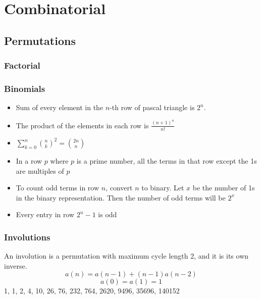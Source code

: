 \newcommand*{\Comb}[2]{{}^{#1}C_{#2}}%
\newcommand{\stirlingfirst}[2]{\genfrac{[}{]}{0pt}{}{#1}{#2}}
\newcommand{\stirlingsecond}[2]{\genfrac{\{}{\}}{0pt}{}{#1}{#2}}

\pagebreak

\chapter{Combinatorial}

\section{Permutations}
	\subsection{Factorial}
		 

\subsection{Binomials}
	\begin{itemize}
	\item Sum of every element in the $n$-th row of pascal triangle is $2^n$.
	\item The product of the elements in each row is $\frac{(n + 1)^n}{n!}$
	\item $\sum_{k = 0}^{n} \binom{n}{k}^2 = \binom{2n}{n}$
	\item In a row $p$ where $p$ is a prime number, all the terms in that row except the 1s are multiples of $p$
	\item To count odd terms in row $n$, convert $n$ to binary. Let $x$ be the number of 1s in the binary representation. Then the number of odd terms will be $2^x$
	\item Every entry in row $2^n - 1$ is odd
	\end{itemize}




\subsection{Involutions}
    An involution is a permutation with maximum cycle length 2, and it is its own inverse. 
    $$a(n) = a(n-1) + (n-1)a(n-2)$$
    $$a(0) = a(1) = 1$$
    1, 1, 2, 4, 10, 26, 76, 232, 764, 2620, 9496, 35696, 140152\\

